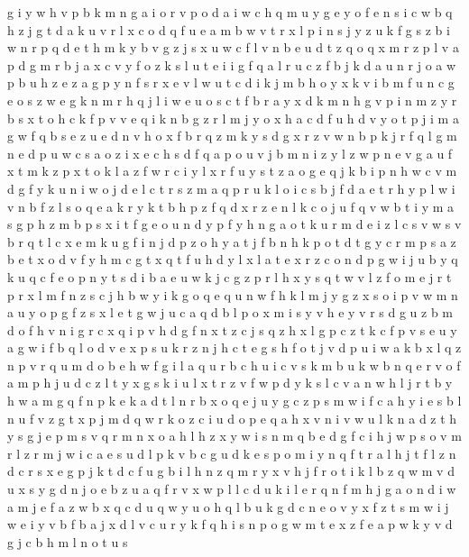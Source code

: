 \documentclass{article}
\begin{document}
g i
y w h v p b k m n g a i o
r v p o d a i w c h q m u y g e
y o f e n s i c w b q h z j g t d a k u v r l x
c o d q f u e a m b w v t r x l p i n s j y z
u k f g s z b
i w n r p q d e t h m k y b v g z j s x u
w c
f l v n b e u d t z q o
q x m r z p l v a
p d g m r b j a x c v y f o z k s l u t e i
i g f q a l r u
c z f b j k d a u n
r j o a w p b u h z e
z a g p y n f s r x e v l w u t c d i k j m b h o
y x k v i b m f u n c g e o s z w
e g k n m r h q
j l i w e u o s c t f b r a y x d k m n h g v p
i n m z y r b s x t o h c k f p v
v e q i k n b g z r l m j y o x h a c d f
u h d v y o t p j i m a g w f q b s e z
u e d n v h o x f b r q z m k y s
d g x r z v w n b p
k j r f q l g m n e d p u w c s a o z i x
e c h s d f q a p o u v j b m n i z y l
z w p n e v g a u f
x t m k z
p x t o k l a z f w r c i y
l x r f u y s t z a o g e q j k b i p n h w c v m d
g f y k u n i w o j d e l c t r s z m a q
p r u k l o i
c s b j f d a e t r h y p l w i
v n b f z l s o q e a k
r y k t b h p z f q
d x r z e n l k c o j u f q v w b t i y m a s g p h
z m b p s x i t f g e o u n d y
p f y h n g a o t k u r m d e i z l c s v w
s v b r q t l c x e m k u g f i n j d p z o h y a
t j
f b n
h k p o t d
t
g y c r m p s a z b e t x o d v
f y h m c g
t x q
t f u h d y l x
l a t e x r z c o n d p g w i j u b y q k
u q c f e o p n y t s d i
b a e u w k j c g z p r l h x y s q t
w v l z f o m e j r
t
p r x l m f n z s c j h b w y i k g o q e
q u n w f h k l m j y g z x s o i p v
w m n a u y o p g f z s x l e
t g w j u c a q d b l p o x m i s y v h
e y v r
s d g
u z b m d o f h v n i g r c x q
i p v h d g f n x t z c j s q
z h x l g p c
z t k c f p v s e u
y a g w i f b q l o d v e x p s u k r z n j h c t
e g s h f o t j v d p u i w a k b x l q
z n p v r q u m d o b e h w f g i l a
q u r b c
h u i c
v s k m b u
k
w b n q e r v o f a m p h j u d c z l t y x g s k i
u l x t r z v f w p d y k s
l c v a n w h
l j r t b y h w a m g q f n p k e
k a d t l n r b x o q e j u y g c z p s m w i f
c a h y i e s b l n u f v z g t x p j m d q w r k o
z c i u d o p e q a h x v n
i v w u l k n a d z t h y s g j e p m
s v q r m n x o a h
l h z x y w i s n m
q b e d g f c i h j w p s o v m r l z
r m j w i c a e s u d l p k v
b c g u d k e s p o m i y n q f t r a l h
j t f l z n d c r s x e g p
j k
t d c f u g b i l h n z q m r y x v
h j f r o t i k l b z q w m v d u x
s y g d n j o e b z u a q f r v x w p l
l c d
u k i l e r q n f m h j g a
o n d i w a m j e
f a z w
b x q c d
u q w
y
u o h
q l b u k g d c n e o v y x f z t s m w i j
w e i y v
b f
b a j x d l v c u r y k f q h i s n p o g w m t e
x z f e a p w k y v d g j c b h m l n o t u s
\end{document}
